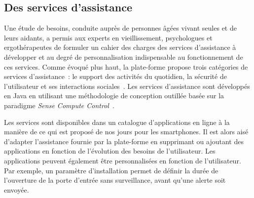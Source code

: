 \subsection{Des services d'assistance}
Une étude de besoins, conduite auprès de personnes âgées vivant seules
et de leurs aidants, a permis aux experts en vieillissement,
psychologues et ergothérapeutes de formuler un cahier des charges des
services d'assistance à développer et au degré de personnalisation
indispensable au fonctionnement de ces services.  Comme évoqué plus
haut, la plate-forme propose trois catégories de services
d'assistance~: le support des activités du quotidien, la sécurité de
l'utilisateur et ses interactions
sociales~. Les services d'assistance
sont développés en Java en utilisant une méthodologie de conception
outillée basée sur la paradigme {\em Sense Compute
  Control}~.

Les services sont disponibles dans un catalogue d'applications en
ligne à la manière de ce qui est proposé de nos jours pour les
smartphones. Il est alors aisé d'adapter l'assistance fournie par la
plate-forme en supprimant ou ajoutant des applications en fonction de
l'évolution des besoins de l'utilisateur. Les applications peuvent
également être personnalisées en fonction de l'utilisateur. Par
exemple, un paramètre d'installation permet de définir la durée de
l'ouverture de la porte d'entrée sans surveillance, avant qu'une
alerte soit envoyée.

